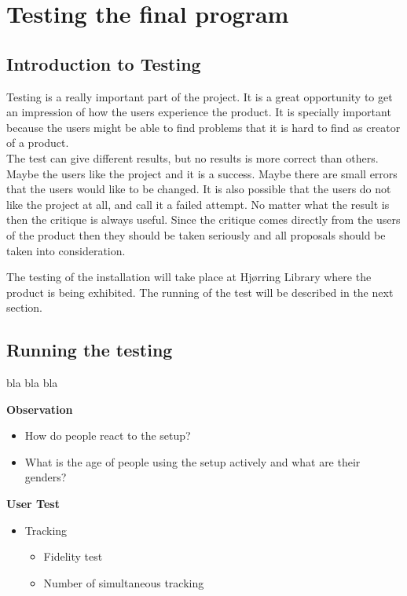 \chapter{Testing the final program}
\section{Introduction to Testing}
Testing is a really important part of the project. It is a great opportunity to get an impression of how the users experience the product. It is specially important because the users might be able to find problems that it is hard to find as creator of a product. \\
The test can give different results, but no results is more correct than others. Maybe the users like the project and it is a success. Maybe there are small errors that the users would like to be changed. It is also possible that the users do not like the project at all, and call it a failed attempt. No matter what the result is then the critique is always useful. Since the critique comes directly from the users of the product then they should be taken seriously and all proposals should be taken into consideration. 

The testing of the installation will take place at Hj{\o}rring Library where the product is being exhibited. The running of the test will be described in the next section.




\section{Running the testing}
bla bla bla

\textbf{Observation}
\begin{itemize}
\item How do people react to the setup?	
\item What is the age of people using the setup actively and what are their genders?
\end{itemize}

\textbf{User Test}
\begin{itemize}
\item Tracking
\begin{itemize}
\item Fidelity test
\item Number of simultaneous tracking
\end{itemize}
\end{itemize}


